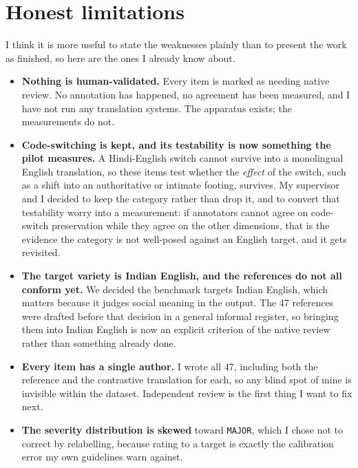 \documentclass[11pt]{article}
\newcommand{\code}[1]{\texttt{\small #1}}
\begin{document}
\section{Honest limitations}

I think it is more useful to state the weaknesses plainly than to present the work
as finished, so here are the ones I already know about.

\begin{itemize}
  \item \textbf{Nothing is human-validated.} Every item is marked as needing native
  review. No annotation has happened, no agreement has been measured, and I have
  not run any translation systems. The apparatus exists; the measurements do not.
  \item \textbf{Code-switching is kept, and its testability is now something the
  pilot measures.} A Hindi-English switch cannot survive into a monolingual English
  translation, so these items test whether the \emph{effect} of the switch, such as
  a shift into an authoritative or intimate footing, survives. My supervisor and I
  decided to keep the category rather than drop it, and to convert that testability
  worry into a measurement: if annotators cannot agree on code-switch preservation
  while they agree on the other dimensions, that is the evidence the category is not
  well-posed against an English target, and it gets revisited.
  \item \textbf{The target variety is Indian English, and the references do not all
  conform yet.} We decided the benchmark targets Indian English, which matters
  because it judges social meaning in the output. The 47 references were drafted
  before that decision in a general informal register, so bringing them into Indian
  English is now an explicit criterion of the native review rather than something
  already done.
  \item \textbf{Every item has a single author.} I wrote all 47, including both the
  reference and the contrastive translation for each, so any blind spot of mine is
  invisible within the dataset. Independent review is the first thing I want to fix
  next.
  \item \textbf{The severity distribution is skewed} toward \code{MAJOR}, which I
  chose not to correct by relabelling, because rating to a target is exactly the
  calibration error my own guidelines warn against.
\end{itemize}
\end{document}
